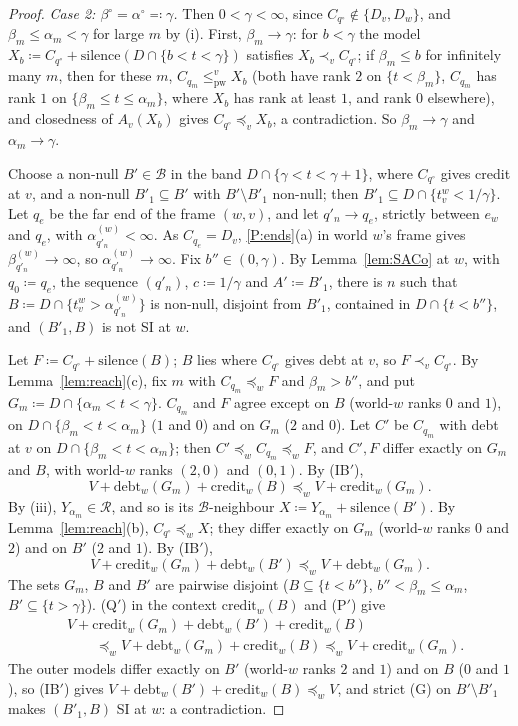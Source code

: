 \documentclass[11pt]{article}
\theoremstyle{definition}\newtheorem{definition}[theorem]{Definition}
\theoremstyle{remark}\newtheorem{remark}[theorem]{Remark}
\newcommand{\debt}{\mathrm{debt}}
\newcommand{\cred}{\mathrm{credit}}
\newcommand{\sil}{\mathrm{silence}}
\newcommand{\Bfam}{\mathcal B}
\newcommand{\pw}{\mathrm{pw}}
\begin{document}
\begin{proof}
\emph{Case 2: $\beta^\circ=\alpha^\circ\eqqcolon\gamma$.} Then
$0<\gamma<\infty$, since $C_{q^\circ}\notin\{D_v,D_w\}$, and
$\beta_m\le\alpha_m<\gamma$ for large $m$ by (i). First, $\beta_m\to\gamma$:
for $b<\gamma$ the model $X_b\coloneqq C_{q^\circ}+\sil(D\cap\{b<t<\gamma\})$
satisfies $X_b\prec_vC_{q^\circ}$; if $\beta_m\le b$ for infinitely many
$m$, then for these $m$, $C_{q_m}\le^v_\pw X_b$ (both have rank $2$ on
$\{t<\beta_m\}$, $C_{q_m}$ has rank $1$ on $\{\beta_m\le t\le\alpha_m\}$,
where $X_b$ has rank at least $1$, and rank $0$ elsewhere), and closedness
of $A_v(X_b)$ gives $C_{q^\circ}\preceq_vX_b$, a contradiction. So
$\beta_m\to\gamma$ and $\alpha_m\to\gamma$.

Choose a non-null $B'\in\Bfam$ in the band $D\cap\{\gamma<t<\gamma+1\}$,
where $C_{q^\circ}$ gives credit at $v$, and a non-null $B'_1\subseteq B'$
with $B'\setminus B'_1$ non-null; then $B'_1\subseteq D\cap\{t^w_v<
1/\gamma\}$. Let $q_e$ be the far end of the frame $(w,v)$, and let
$q'_n\to q_e$, strictly between $e_w$ and $q_e$, with
$\alpha^{(w)}_{q'_n}<\infty$. As $C_{q_e}=D_v$, \ref{P:ends}(a) in world
$w$'s frame gives $\beta^{(w)}_{q'_n}\to\infty$, so
$\alpha^{(w)}_{q'_n}\to\infty$. Fix $b''\in(0,\gamma)$. By
Lemma~\ref{lem:SACo} at $w$, with $q_0\coloneqq q_e$, the sequence $(q'_n)$,
$c\coloneqq1/\gamma$ and $A'\coloneqq B'_1$, there is $n$ such that
$B\coloneqq D\cap\{t^w_v>\alpha^{(w)}_{q'_n}\}$ is non-null, disjoint from
$B'_1$, contained in $D\cap\{t<b''\}$, and $(B'_1,B)$ is not SI at $w$.

Let $F\coloneqq C_{q^\circ}+\sil(B)$; $B$ lies where $C_{q^\circ}$ gives debt
at $v$, so $F\prec_vC_{q^\circ}$. By Lemma~\ref{lem:reach}(c), fix $m$ with
$C_{q_m}\preceq_wF$ and $\beta_m>b''$, and put $G_m\coloneqq D\cap
\{\alpha_m<t<\gamma\}$. $C_{q_m}$ and $F$ agree except on $B$ (world-$w$
ranks $0$ and $1$), on $D\cap\{\beta_m<t<\alpha_m\}$ ($1$ and $0$) and on
$G_m$ ($2$ and $0$). Let $C'$ be $C_{q_m}$ with debt at $v$ on
$D\cap\{\beta_m<t<\alpha_m\}$; then $C'\preceq_wC_{q_m}\preceq_wF$, and
$C',F$ differ exactly on $G_m$ and $B$, with world-$w$ ranks $(2,0)$ and
$(0,1)$. By (IB$'$),
\[
 V+\debt_w(G_m)+\cred_w(B)\preceq_wV+\cred_w(G_m).\tag{P$'$}
\]
By (iii), $Y_{\alpha_m}\in\mathcal R$, and so is its $\Bfam$-neighbour
$X\coloneqq Y_{\alpha_m}+\sil(B')$. By Lemma~\ref{lem:reach}(b),
$C_{q^\circ}\preceq_wX$; they differ exactly on $G_m$ (world-$w$ ranks
$0$ and $2$) and on $B'$ ($2$ and $1$). By (IB$'$),
\[
 V+\cred_w(G_m)+\debt_w(B')\preceq_wV+\debt_w(G_m).\tag{Q$'$}
\]
The sets $G_m$, $B$ and $B'$ are pairwise disjoint ($B\subseteq\{t<
b''\}$, $b''<\beta_m\le\alpha_m$, $B'\subseteq\{t>\gamma\}$). (Q$'$) in the
context $\cred_w(B)$ and (P$'$) give
\begin{align*}
 &V+\cred_w(G_m)+\debt_w(B')+\cred_w(B)\\
 &\qquad\preceq_wV+\debt_w(G_m)+\cred_w(B)\preceq_wV+\cred_w(G_m).
\end{align*}
The outer models differ exactly on $B'$ (world-$w$ ranks $2$ and $1$) and on
$B$ ($0$ and $1$), so (IB$'$) gives $V+\debt_w(B')+\cred_w(B)\preceq_wV$,
and strict (G) on $B'\setminus B'_1$ makes $(B'_1,B)$ SI at $w$: a
contradiction.


\end{proof}
\end{document}
